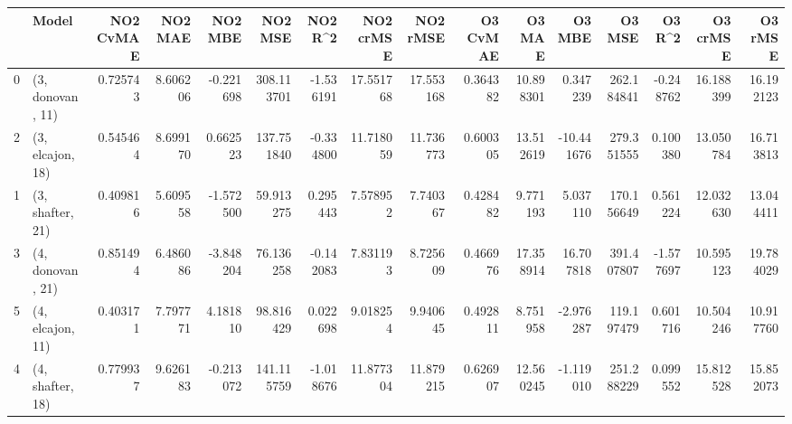 \begin{tabular}{llrrrrrrrrrrrrrr}
\toprule
{} &             Model &  NO2 CvMAE &   NO2 MAE &   NO2 MBE &     NO2 MSE &   NO2 R\textasciicircum2 &  NO2 crMSE &   NO2 rMSE &  O3 CvMAE &     O3 MAE &     O3 MBE &      O3 MSE &    O3 R\textasciicircum2 &   O3 crMSE &    O3 rMSE \\
\midrule
0 &  (3, donovan, 11) &   0.725743 &  8.606206 & -0.221698 &  308.113701 & -1.536191 &  17.551768 &  17.553168 &  0.364382 &  10.898301 &   0.347239 &  262.184841 & -0.248762 &  16.188399 &  16.192123 \\
2 &  (3, elcajon, 18) &   0.545464 &  8.699170 &  0.662523 &  137.751840 & -0.334800 &  11.718059 &  11.736773 &  0.600305 &  13.512619 & -10.441676 &  279.351555 &  0.100380 &  13.050784 &  16.713813 \\
1 &  (3, shafter, 21) &   0.409816 &  5.609558 & -1.572500 &   59.913275 &  0.295443 &   7.578952 &   7.740367 &  0.428482 &   9.771193 &   5.037110 &  170.156649 &  0.561224 &  12.032630 &  13.044411 \\
3 &  (4, donovan, 21) &   0.851494 &  6.486086 & -3.848204 &   76.136258 & -0.142083 &   7.831193 &   8.725609 &  0.466976 &  17.358914 &  16.707818 &  391.407807 & -1.577697 &  10.595123 &  19.784029 \\
5 &  (4, elcajon, 11) &   0.403171 &  7.797771 &  4.181810 &   98.816429 &  0.022698 &   9.018254 &   9.940645 &  0.492811 &   8.751958 &  -2.976287 &  119.197479 &  0.601716 &  10.504246 &  10.917760 \\
4 &  (4, shafter, 18) &   0.779937 &  9.626183 & -0.213072 &  141.115759 & -1.018676 &  11.877304 &  11.879215 &  0.626907 &  12.560245 &  -1.119010 &  251.288229 &  0.099552 &  15.812528 &  15.852073 \\
\bottomrule
\end{tabular}
